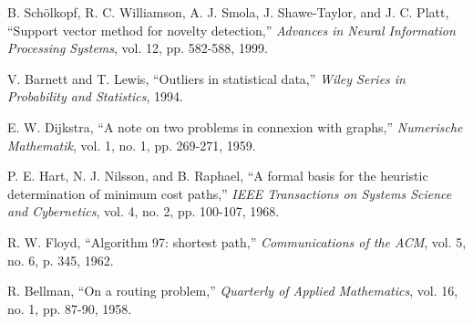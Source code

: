 \documentclass[12pt,twoside,a4paper,fleqn,bibliography=totocnumbered]{report}
\begin{document}
\begin{thebibliography}{1}
 B. Schölkopf, R. C. Williamson, A. J. Smola, J. Shawe-Taylor, and J. C. Platt, ``Support vector method for novelty detection,'' \emph{Advances in Neural Information Processing Systems}, vol. 12, pp. 582-588, 1999.

 V. Barnett and T. Lewis, ``Outliers in statistical data,'' \emph{Wiley Series in Probability and Statistics}, 1994.

 E. W. Dijkstra, ``A note on two problems in connexion with graphs,'' \emph{Numerische Mathematik}, vol. 1, no. 1, pp. 269-271, 1959.

 P. E. Hart, N. J. Nilsson, and B. Raphael, ``A formal basis for the heuristic determination of minimum cost paths,'' \emph{IEEE Transactions on Systems Science and Cybernetics}, vol. 4, no. 2, pp. 100-107, 1968.

 R. W. Floyd, ``Algorithm 97: shortest path,'' \emph{Communications of the ACM}, vol. 5, no. 6, p. 345, 1962.

 R. Bellman, ``On a routing problem,'' \emph{Quarterly of Applied Mathematics}, vol. 16, no. 1, pp. 87-90, 1958.

\end{thebibliography}
\end{document}
